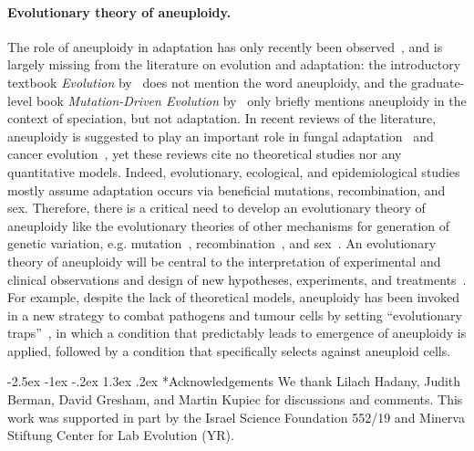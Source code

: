 \documentclass[12pt]{extarticle}
\makeatletter
\renewcommand\section{\@startsection {section}{1}{\z@}%
     {-2.5ex \@plus -1ex \@minus -.2ex}%
     {1.3ex \@plus.2ex}%
    {\Large\bfseries}}
\makeatother
\begin{document}
\paragraph*{Evolutionary theory of aneuploidy.}
The role of aneuploidy in adaptation has only recently been observed~\citep{Sionov2010, Yona2012, Gerstein2015}, and is largely missing from the literature on evolution and adaptation:
the introductory textbook \emph{Evolution} by~\citet{Bergstrom2012} does not mention the word aneuploidy, and the graduate-level book \emph{Mutation-Driven Evolution} by~\citet{Nei2013} only briefly mentions aneuploidy in the context of speciation, but not adaptation.
In recent reviews of the literature, aneuploidy is suggested to play an important role in fungal adaptation~\citep{Robbins2017, Todd2017} and cancer evolution~\citep{Santaguida2015review, Naylor2016, Sansregret2017}, yet these reviews cite no theoretical studies nor any quantitative models.
Indeed, evolutionary, ecological, and epidemiological studies mostly assume adaptation occurs via beneficial mutations, recombination, and sex.
Therefore, there is a critical need to develop an evolutionary theory of aneuploidy like the evolutionary theories of other mechanisms for generation of genetic variation, e.g. mutation~\citep{Lynch2010}, recombination~\citep{Hartfield2012}, and sex~\citep{Otto2009}.
An evolutionary theory of aneuploidy will be central to the interpretation of experimental and clinical observations and design of new hypotheses, experiments, and treatments~\citep{Carja2014}.
For example, despite the lack of theoretical models, aneuploidy has been invoked in a new strategy to combat pathogens and tumour cells by setting “evolutionary traps”~\citep{Gerstein2015,Chen2015}, in which a condition that predictably leads to emergence of aneuploidy is applied, followed by a condition that specifically selects against aneuploid cells.

\pagebreak
{\small
\section*{Acknowledgements}
We thank Lilach Hadany, Judith Berman, David Gresham, and Martin Kupiec for discussions and comments.
This work was supported in part by 
the Israel Science Foundation 552/19 and Minerva
Stiftung Center for Lab Evolution (YR).
}



\end{document}
